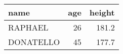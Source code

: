 \begin{tabular}{lrr}
    \toprule
    name      & age & height \\
    \midrule
    RAPHAEL   & 26  & 181.2  \\
    DONATELLO & 45  & 177.7  \\
    \bottomrule
\end{tabular}

